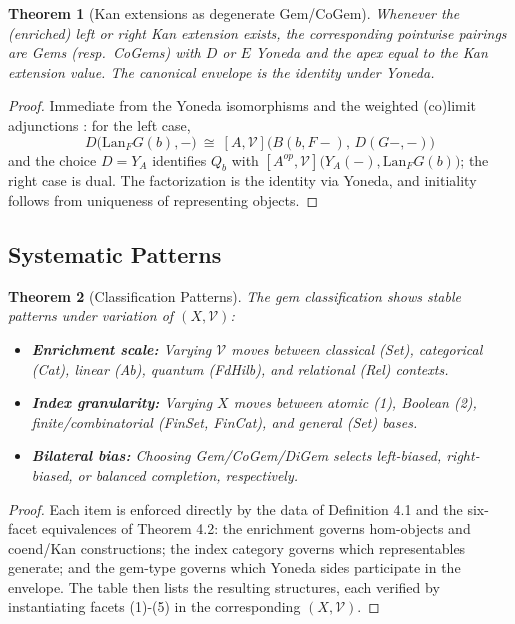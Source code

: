 \documentclass[11pt]{article}
\theoremstyle{plain}
\newtheorem{theorem}{Theorem}[section]
\theoremstyle{definition}
\theoremstyle{remark}
\newcommand{\V}{\mathcal{V}}
\newcommand{\Lan}{\mathrm{Lan}}
\begin{document}
\begin{theorem}[Kan extensions as degenerate Gem/CoGem]\label{thm:kan-gem}
Whenever the (enriched) left or right Kan extension exists, the corresponding pointwise pairings are Gems (resp.\ CoGems) with $D$ or $E$ Yoneda and the apex equal to the Kan extension value. The canonical envelope is the identity under Yoneda.
\end{theorem}

\begin{proof}
Immediate from the Yoneda isomorphisms and the weighted (co)limit adjunctions \cite[Ch.~3]{kelly1982basic}: for the left case,
$$
D\big(\Lan_F G(b),-\big)\ \cong\ [A,\V]\big(B(b,F-),\,D(G-,-)\big)
$$
and the choice $D=Y_A$ identifies $Q_b$ with $[A^{op},\V]\big(Y_A(-),\Lan_F G(b)\big)$; the right case is dual. The factorization is the identity via Yoneda, and initiality follows from uniqueness of representing objects.
\end{proof}

\subsection{Systematic Patterns}

\begin{theorem}[Classification Patterns]
The gem classification shows stable patterns under variation of $(X, \V)$:

\begin{itemize}
\item \textbf{Enrichment scale:} Varying $\V$ moves between classical (Set), categorical (Cat), linear (Ab), quantum (FdHilb), and relational (Rel) contexts.

\item \textbf{Index granularity:} Varying $X$ moves between atomic (1), Boolean (2), finite/combinatorial (FinSet, FinCat), and general (Set) bases.

\item \textbf{Bilateral bias:} Choosing Gem/CoGem/DiGem selects left-biased, right-biased, or balanced completion, respectively.
\end{itemize}
\end{theorem}

\begin{proof}
Each item is enforced directly by the data of Definition 4.1 and the six-facet equivalences of Theorem 4.2: the enrichment governs hom-objects and coend/Kan constructions; the index category governs which representables generate; and the gem-type governs which Yoneda sides participate in the envelope. The table then lists the resulting structures, each verified by instantiating facets (1)-(5) in the corresponding $(X, \V)$.
\end{proof}
\end{document}
